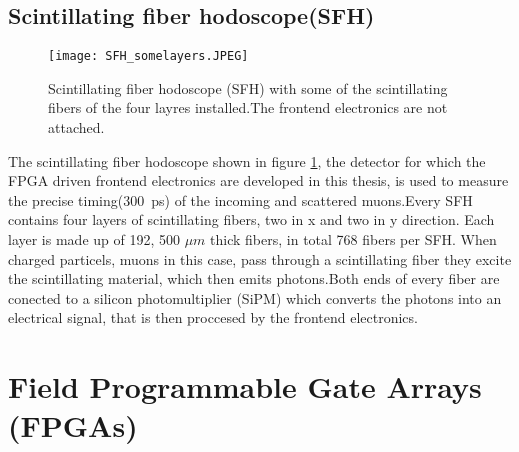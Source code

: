\subsection{Scintillating fiber hodoscope(SFH)}
\begin{figure}[H]
	\centering
	\texttt{[image: SFH\_somelayers.JPEG]}
	\caption{Scintillating fiber hodoscope (SFH) with some of the scintillating fibers of the four layres installed.The frontend electronics are not attached.\autocite{InternalcommunicationKarl}}
	\label{SFHpicture}
\end{figure}
The scintillating fiber hodoscope shown in figure \ref{SFHpicture}, the detector for which the FPGA driven frontend electronics are developed in this thesis,
is used to measure the precise timing(\SI{300}{\pico\second}\Autocite{Amber2022Status}) of the incoming and scattered muons.Every SFH contains four layers of scintillating fibers, two in x and two in y direction.
Each layer is made up of 192\autocite{Amber2022Status}, 500 $\mu m$ thick\autocite{Amber2024Status} fibers, in total 768\autocite{Amber2022Status} fibers per SFH. 
When charged particels, muons in this case, pass through a scintillating fiber they excite the scintillating material, 
which then emits photons.Both ends of every fiber are conected to a silicon photomultiplier (SiPM) which converts the photons into an electrical signal, that is then proccesed by the frontend electronics.

\section{Field Programmable Gate Arrays (FPGAs)}\label{sec:FPGA}

